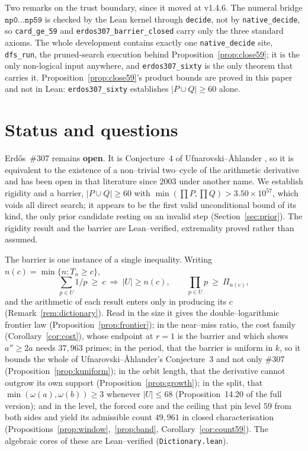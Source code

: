 \documentclass[11pt]{article}
\theoremstyle{definition}
\begin{document}
Two remarks on the trust boundary, since it moved at v1.4.6. The numeral bridge
$\texttt{np0}\dots\texttt{np59}$ is checked by the Lean kernel through \texttt{decide}, not by
\texttt{native\_decide}, so \texttt{card\_ge\_59} and \texttt{erdos307\_barrier\_closed} carry only
the three standard axioms. The whole development contains exactly one \texttt{native\_decide} site,
\texttt{dfs\_run}, the pruned-search execution behind Proposition~\ref{prop:close59}; it is the only
non-logical input anywhere, and \texttt{erdos307\_sixty} is the only theorem that carries it.
Proposition~\ref{prop:close59}'s product bounds are proved in this paper and not in Lean:
\texttt{erdos307\_sixty} establishes $|P\cup Q|\ge60$ alone.

\section{Status and questions}\label{sec:status}

Erd\H{o}s~\#307 remains \textbf{open}. It is Conjecture~4 of Ufnarovski--\AA hlander
\cite{UfnarovskiAhlander2003}, so it is equivalent to the existence of a non--trivial two--cycle of
the arithmetic derivative and has been open in that literature since $2003$ under another name. We
establish rigidity and a barrier, $|P\cup Q|\ge60$ with $\min(\prod P,\prod Q)>3.50\times10^{57}$,
which voids all direct search; it appears to be the first valid unconditional bound of its kind,
the only prior candidate resting on an invalid step (Section~\ref{sec:prior}). The rigidity result
and the barrier are Lean--verified, extremality proved rather than assumed.

The barrier is one instance of a single inequality. Writing $n(c)=\min\{n:T_n\ge c\}$,
\[ \sum_{p\in U}1/p\ \ge\ c\ \Longrightarrow\ |U|\ge n(c),\qquad \prod_{p\in U}p\ \ge\ \Pi_{n(c)}, \]
and the arithmetic of each result enters only in producing its $c$ (Remark~\ref{rem:dictionary}).
Read in the size it gives the double--logarithmic frontier law
(Proposition~\ref{prop:frontier}); in the near--miss ratio, the cost family
(Corollary~\ref{cor:cost}), whose endpoint at $r=1$ is the barrier and which shows $a''\ge2a$ needs
$37{,}963$ primes; in the period, that the barrier is uniform in $k$, so it bounds the whole of
Ufnarovski--\AA hlander's Conjecture~3 and not only \#307 (Proposition~\ref{prop:kuniform}); in the
orbit length, that the derivative cannot outgrow its own support
(Proposition~\ref{prop:growth}); in the split, that $\min(\omega(a),\omega(b))\ge3$ whenever
$|U|\le68$ (Proposition~14.20 of the full version); and in the level, the forced core and the ceiling that
pin level $59$ from both sides and yield its admissible count $49{,}961$ in closed characterisation
(Propositions~\ref{prop:window},~\ref{prop:band}, Corollary~\ref{cor:count59}). The algebraic cores
of these are Lean--verified (\texttt{Dictionary.lean}).
\end{document}
